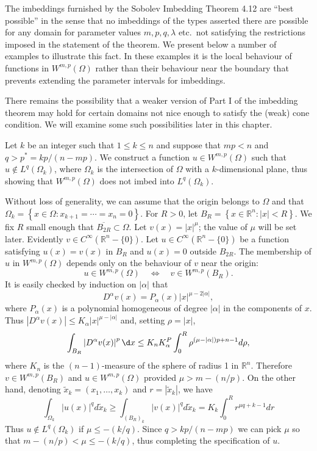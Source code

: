 \begin{para}
  The imbeddings furnished by the Sobolev Imbedding Theorem 4.12 are ``best possible'' in the sense that
  no imbeddings of the types asserted there are possible for any domain for parameter values $m, p, q, \lambda$ 
  etc.\ not satisfying the restrictions imposed in the statement of the theorem.
  We present below a number of examples to illustrate this fact.
  In these examples it is the local behaviour of functions in $W^{m,p}(\Omega)$ rather than their behaviour 
  near the boundary that prevents extending the parameter intervals for imbeddings.
  
  There remains the possibility that a weaker version of Part I of the imbedding theorem may hold for certain 
  domains not nice enough to satisfy the (weak) cone condition.
  We will examine some such possibilities later in this chapter.
\end{para}


\begin{example}
  Let $k$ be an integer such that $1 \leq k \leq n$ and suppose that $m p<n$ and $q>p^*=k p /(n-m p)$. We construct a function $u \in W^{m,p}(\Omega)$ such that $u \notin L^q(\Omega_k)$, where $\Omega_k$ is the intersection of $\Omega$ with a $k$-dimensional plane, thus showing that $W^{m,p}(\Omega)$ does not imbed into $L^q(\Omega_k)$.
  
  Without loss of generality, we can assume that the origin belongs to $\Omega$ and that $\Omega_k=\left\{x \in \Omega: x_{k+1}=\cdots=x_n=0\right\}$. For $R>0$, let $B_R=\left\{x \in \mathbb{R}^n:|x|<R\right\}$. We fix $R$ small enough that $\overline{B_{2 R}} \subset \Omega$. Let $v(x)=|x|^\mu$; the value of $\mu$ will be set later. Evidently $v \in C^{\infty}\left(\mathbb{R}^n-\{0\}\right)$. Let $u \in C^{\infty}\left(\mathbb{R}^n-\{0\}\right)$ be a function satisfying $u(x)=v(x)$ in $B_R$ and $u(x)=0$ outside $B_{2 R}$. The membership of $u$ in $W^{m,p}(\Omega)$ depends only on the behaviour of $v$ near the origin:
  \[
  u \in W^{m,p}(\Omega) \quad \Longleftrightarrow \quad v \in W^{m,p}\left(B_R\right) .
  \]
  It is easily checked by induction on $|\alpha|$ that
  \[
  D^\alpha v(x)=P_\alpha(x)|x|^{\mu-2|\alpha|},
  \]
  where $P_\alpha(x)$ is a polynomial homogeneous of degree $|\alpha|$ in the components of $x$. Thus $\left|D^\alpha v(x)\right| \leq K_\alpha|x|^{\mu-|\alpha|}$ and, setting $\rho=|x|$,
  \[
  \int_{B_R}\left|D^\alpha v(x)\right|^p \d x \leq K_n K_\alpha^P \int_0^R \rho^{(\mu-|\alpha|) p+n-1} d \rho,
  \]
  where $K_n$ is the $(n-1)$-measure of the sphere of radius 1 in $\mathbb{R}^n$. Therefore $v \in W^{m,p}\left(B_R\right)$ and $u \in W^{m,p}(\Omega)$ provided $\mu>m-(n / p)$.
  On the other hand, denoting $\tilde{x}_k=\left(x_1, \ldots, x_k\right)$ and $r=\left|\tilde{x}_k\right|$, we have
  \[
  \int_{\Omega_k}|u(x)|^q d \tilde{x}_k \geq \int_{\left(B_R\right)_k}|v(x)|^q d \tilde{x}_k=K_k \int_0^R r^{\mu q+k-1} d r
  \]
  Thus $u \notin L^q(\Omega_k)$ if $\mu \leq-(k / q)$.
  Since $q>k p /(n-m p)$ we can pick $\mu$ so that $m-(n / p)<\mu \leq-(k / q)$, thus completing the specification of $u$.
\end{example}


